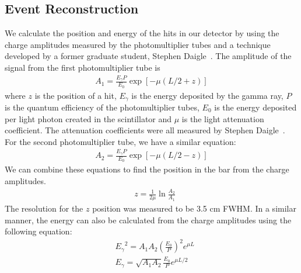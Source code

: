 \subsection{Event Reconstruction}
 We calculate the position and energy of the hits in our detector by using the charge amplitudes measured by the photomultiplier tubes and a technique developed by a former graduate student, Stephen Daigle~\cite{StephenDaigle}. The amplitude of the signal from the first photomultiplier tube is
 \begin{align}
   A_{1}=\frac{E_{\gamma}P}{E_{0}}\exp[-\mu(L/2+z)]
 \end{align}
 where $z$ is the position of a hit, $E_{\gamma}$ is the energy deposited by the gamma ray, $P$ is the quantum efficiency of the photomultiplier tubes, $E_{0}$ is the energy deposited per light photon created in the scintillator and $\mu$ is the light attenuation coefficient. The attenuation coefficients were all measured by Stephen Daigle~\cite{StephenDaigle}. For the second photomultiplier tube, we have a similar equation:
 \begin{align}
 A_{2}=\frac{E_{\gamma}P}{E_{0}}\exp[-\mu(L/2-z)]
 \end{align}
 We can combine these equations to find the position in the bar from the charge amplitudes.
\begin{align}
 &z=\frac{1}{2\mu}\ln\frac{A_{2}}{A_{1}}
 \end{align}
 The resolution for the $z$ position was measured to be 3.5 cm FWHM.
 In a similar manner, the energy can also be calculated from the charge amplitudes using the following equation:
 \begin{align}
 &{E_{\gamma}}^{2}=A_{1}A_{2}\left(\frac{E_{0}}{P}\right)^2e^{{\mu}L} \\
 &E_{\gamma}=\sqrt{A_{1}A_{2}}\frac{E_{0}}{P}e^{{\mu}L/2}
 \end{align}



